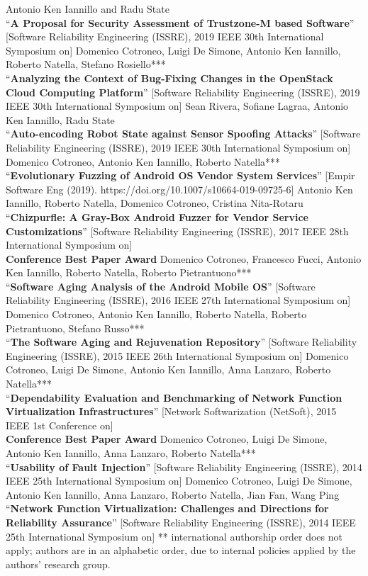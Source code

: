 \documentclass[margin,line]{resume}
\begin{document}
\begin{resume}
\filbreak
Antonio Ken Iannillo and Radu State\\
``\textbf{A Proposal for Security Assessment of Trustzone-M based Software}''
[Software Reliability Engineering (ISSRE), 2019 IEEE 30th International Symposium on]
\filbreak
Domenico Cotroneo, Luigi De Simone, Antonio Ken Iannillo, Roberto Natella, Stefano Rosiello***\\
``\textbf{Analyzing the Context of Bug-Fixing Changes in the OpenStack Cloud Computing Platform}''
[Software Reliability Engineering (ISSRE), 2019 IEEE 30th International Symposium on]
\filbreak
Sean Rivera, Sofiane Lagraa, Antonio Ken Iannillo, Radu State\\
``\textbf{Auto-encoding Robot State against Sensor Spoofing Attacks}''
[Software Reliability Engineering (ISSRE), 2019 IEEE 30th International Symposium on]
\filbreak
Domenico Cotroneo, Antonio Ken Iannillo, Roberto Natella***\\
``\textbf{Evolutionary Fuzzing of Android OS Vendor System Services}''
[Empir Software Eng (2019). https://doi.org/10.1007/s10664-019-09725-6]
\filbreak
Antonio Ken Iannillo, Roberto Natella, Domenico Cotroneo, Cristina Nita-Rotaru\\
``\textbf{Chizpurfle: A Gray-Box Android Fuzzer for Vendor Service Customizations}''
[Software Reliability Engineering (ISSRE), 2017 IEEE 28th International Symposium on]\\\textbf{Conference Best Paper Award}
\filbreak
Domenico Cotroneo, Francesco Fucci, Antonio Ken Iannillo, Roberto Natella, Roberto Pietrantuono***\\
``\textbf{Software Aging Analysis of the Android Mobile OS}''
[Software Reliability Engineering (ISSRE), 2016 IEEE 27th International Symposium on]
\filbreak
Domenico Cotroneo, Antonio Ken Iannillo, Roberto Natella, Roberto Pietrantuono, Stefano Russo***\\
``\textbf{The Software Aging and Rejuvenation Repository}''
[Software Reliability Engineering (ISSRE), 2015 IEEE 26th International Symposium on]
\filbreak
Domenico Cotroneo, Luigi De Simone, Antonio Ken Iannillo, Anna Lanzaro, Roberto Natella***\\
``\textbf{Dependability Evaluation and Benchmarking of Network Function Virtualization Infrastructures}''
[Network Softwarization (NetSoft), 2015 IEEE 1st Conference on]\\\textbf{Conference Best Paper Award}
\filbreak
Domenico Cotroneo, Luigi De Simone, Antonio Ken Iannillo, Anna Lanzaro, Roberto Natella***\\
``\textbf{Usability of Fault Injection}''
[Software Reliability Engineering (ISSRE), 2014 IEEE 25th International Symposium on]
\filbreak
Domenico Cotroneo, Luigi De Simone, Antonio Ken Iannillo, Anna Lanzaro, Roberto Natella, Jian Fan, Wang Ping\\
``\textbf{Network Function Virtualization: Challenges and Directions for Reliability Assurance}''
[Software Reliability Engineering (ISSRE), 2014 IEEE 25th International Symposium on]
\filbreak
{\footnotesize*** international authorship order does not apply; authors are in an alphabetic order, due to internal policies applied by the authors' research group.}



\end{resume}
\end{document}

